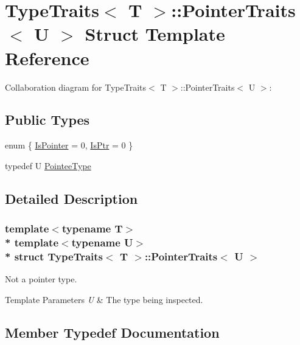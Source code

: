 \hypertarget{structTypeTraits_1_1PointerTraits}{}\section{Type\+Traits$<$ T $>$\+:\+:Pointer\+Traits$<$ U $>$ Struct Template Reference}
\label{structTypeTraits_1_1PointerTraits}


Collaboration diagram for Type\+Traits$<$ T $>$\+:\+:Pointer\+Traits$<$ U $>$\+:
\subsection*{Public Types}
\begin{DoxyCompactItemize}
\item 
enum \{ \hyperlink{structTypeTraits_1_1PointerTraits_aa347275cb9f15c69a7d822f06fc1ff18a9da4883944a6a2b7d823915154aead18}{Is\+Pointer} = 0, 
\hyperlink{structTypeTraits_1_1PointerTraits_aa347275cb9f15c69a7d822f06fc1ff18acc0995ad6c0463570690189171f3d619}{Is\+Ptr} = 0
 \}
\item 
typedef U \hyperlink{structTypeTraits_1_1PointerTraits_a24acc803e3ec4795ae2ec7367de03d4d}{Pointee\+Type}
\end{DoxyCompactItemize}


\subsection{Detailed Description}
\subsubsection*{template$<$typename T$>$\\*
template$<$typename U$>$\\*
struct Type\+Traits$<$ T $>$\+::\+Pointer\+Traits$<$ U $>$}

Not a pointer type. 
\begin{DoxyTemplParams}{Template Parameters}
{\em U} & The type being inspected. \\
\hline
\end{DoxyTemplParams}


\subsection{Member Typedef Documentation}
